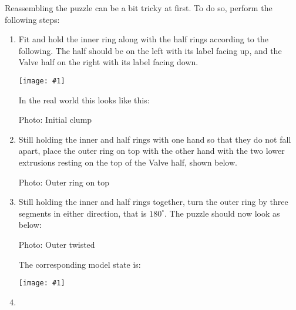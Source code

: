 \documentclass{article}
\newcommand{\diagram}[1]{
      \begin{center}
            \texttt{[image: \#1]}
      \end{center}
}
\newcommand{\photo}[1]{
      \begin{center}
            Photo: #1
      \end{center}
}
\begin{document}
Reassembling the puzzle can be a bit tricky at first.
To do so, perform the following steps:
\begin{enumerate}
      \item Fit and hold the inner ring along with the half rings according to the following.
      The \han{} half should be on the left with its label facing up, and the Valve half on the right with its label facing down.
      \diagram{together-01}
      In the real world this looks like this:
      \photo{Initial clump}
      \item Still holding the inner and half rings with one hand so that they do not fall apart, place the outer ring on top with the other hand with the two lower extrusions resting on the top of the Valve half, shown below.
      \photo{Outer ring on top}
      \item Still holding the inner and half rings together, turn the outer ring by three segments in either direction, that is $180^\circ$.
      The puzzle should now look as below:
      \photo{Outer twisted}
      The corresponding model state is:
      \diagram{together-03}
\item 
\end{enumerate}
\end{document}
